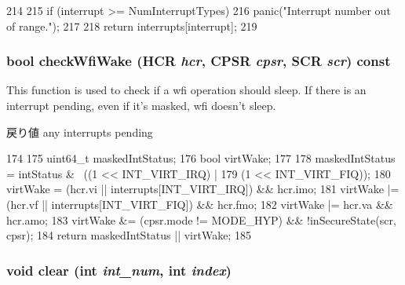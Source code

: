 \begin{DoxyCode}
214     {
215         if (interrupt >= NumInterruptTypes)
216             panic("Interrupt number out of range.\n");
217 
218         return interrupts[interrupt];
219     }
\end{DoxyCode}
\hypertarget{classArmISA_1_1Interrupts_a0b7f3ea5e340cd06e8dc803865a6083a}{
\subsubsection[{checkWfiWake}]{\setlength{\rightskip}{0pt plus 5cm}bool checkWfiWake (HCR {\em hcr}, \/  CPSR {\em cpsr}, \/  SCR {\em scr}) const}}
\label{classArmISA_1_1Interrupts_a0b7f3ea5e340cd06e8dc803865a6083a}
This function is used to check if a wfi operation should sleep. If there is an interrupt pending, even if it's masked, wfi doesn't sleep. \begin{DoxyReturn}{戻り値}
any interrupts pending 
\end{DoxyReturn}



\begin{DoxyCode}
174     {
175         uint64_t maskedIntStatus;
176         bool     virtWake;
177 
178         maskedIntStatus = intStatus & ~((1 << INT_VIRT_IRQ) |
179                                         (1 << INT_VIRT_FIQ));
180         virtWake  = (hcr.vi || interrupts[INT_VIRT_IRQ]) && hcr.imo;
181         virtWake |= (hcr.vf || interrupts[INT_VIRT_FIQ]) && hcr.fmo;
182         virtWake |=  hcr.va                              && hcr.amo;
183         virtWake &= (cpsr.mode != MODE_HYP) && !inSecureState(scr, cpsr);
184         return maskedIntStatus || virtWake;
185     }
\end{DoxyCode}
\hypertarget{classArmISA_1_1Interrupts_af60c3484087379d0330467d77f6cbaae}{
\subsubsection[{clear}]{\setlength{\rightskip}{0pt plus 5cm}void clear (int {\em int\_\-num}, \/  int {\em index})}}
\label{classArmISA_1_1Interrupts_af60c3484087379d0330467d77f6cbaae}



